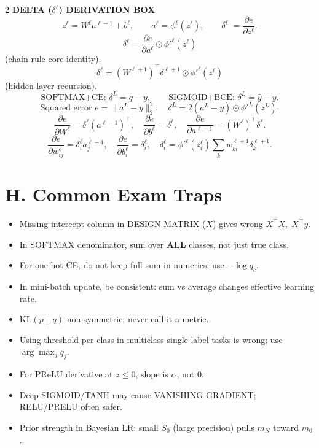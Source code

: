 \documentclass[10pt,fleqn]{article}
\begin{document}
\begin{multicols}{2}
\textbf{DELTA (\(\delta^\ell\)) DERIVATION BOX}
\[
z^\ell=W^\ell a^{\ell-1}+b^\ell,\qquad a^\ell=\phi^\ell(z^\ell),\qquad
\delta^\ell:=\frac{\partial e}{\partial z^\ell}.
\]
\[
\delta^\ell=\frac{\partial e}{\partial a^\ell}\odot \phi'^\ell(z^\ell)
\]
(chain rule core identity).
\[
\delta^\ell=\left(W^{\ell+1}\right)^\top\delta^{\ell+1}\odot \phi'^\ell(z^\ell)
\]
(hidden-layer recursion).
\[
\text{SOFTMAX+CE: }\delta^L=q-y,\qquad
\text{SIGMOID+BCE: }\delta^L=\hat y-y.
\]
\[
\text{Squared error } e=\|a^L-y\|_2^2:\quad
\delta^L=2(a^L-y)\odot \phi'^L(z^L).
\]
\[
\frac{\partial e}{\partial W^\ell}=\delta^\ell (a^{\ell-1})^\top,\quad
\frac{\partial e}{\partial b^\ell}=\delta^\ell,\quad
\frac{\partial e}{\partial a^{\ell-1}}=(W^\ell)^\top\delta^\ell.
\]
\[
\frac{\partial e}{\partial w_{ij}^\ell}=\delta_i^\ell a_j^{\ell-1},\quad
\frac{\partial e}{\partial b_i^\ell}=\delta_i^\ell,\quad
\delta_i^\ell=\phi'^\ell(z_i^\ell)\sum_k w_{ki}^{\ell+1}\delta_k^{\ell+1}.
\]

\section*{H. Common Exam Traps}
\begin{itemize}
  \item Missing intercept column in DESIGN MATRIX (\(X\)) gives wrong \(X^\top X,\;X^\top y\).
  \item In SOFTMAX denominator, sum over \textbf{ALL} classes, not just true class.
  \item For one-hot CE, do not keep full sum in numerics: use \(-\log q_c\).
  \item In mini-batch update, be consistent: sum vs average changes effective learning rate.
  \item \(\mathrm{KL}(p\|q)\) non-symmetric; never call it a metric.
  \item Using threshold per class in multiclass single-label tasks is wrong; use \(\arg\max_j q_j\).
  \item For PReLU derivative at \(z\le 0\), slope is \(\alpha\), not \(0\).
  \item Deep SIGMOID/TANH may cause VANISHING GRADIENT; RELU/PRELU often safer.
  \item Prior strength in Bayesian LR: small \(S_0\) (large precision) pulls \(m_N\) toward \(m_0\).
\end{itemize}


\end{multicols}
\end{document}
